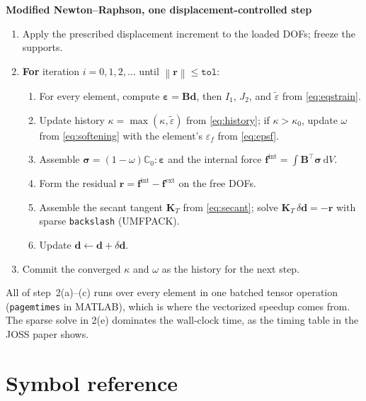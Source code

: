 \documentclass[11pt]{article}
\newcommand{\eps}{\bm{\varepsilon}}
\newcommand{\sig}{\bm{\sigma}}
\newcommand{\C}{\mathbb{C}}
\newcommand{\eqs}{\tilde{\varepsilon}}
\newcommand{\dd}{\,\mathrm{d}}
\newcommand{\norm}[1]{\left\lVert#1\right\rVert}
\begin{document}
\begin{algobox}
\textbf{Modified Newton--Raphson, one displacement-controlled step}
\begin{enumerate}[leftmargin=1.4em,itemsep=2pt]
\item Apply the prescribed displacement increment to the loaded DOFs; freeze the supports.
\item \textbf{For} iteration $i=0,1,2,\dots$ until $\norm{\bm r}\le \texttt{tol}$:
  \begin{enumerate}[leftmargin=1.4em,itemsep=1pt]
  \item For every element, compute $\eps=\bm B\bm d$, then $I_1$, $J_2$, and
        $\eqs$ from \eqref{eq:eqstrain}.
  \item Update history $\kappa=\max(\kappa,\eqs)$ from \eqref{eq:history};
        if $\kappa>\kappa_0$, update $\omega$ from \eqref{eq:softening} with the
        element's $\varepsilon_f$ from \eqref{eq:epsf}.
  \item Assemble $\sig=(1-\omega)\C_0:\eps$ and the internal force
        $\bm f^{\text{int}}=\int\bm B^{\!\top}\sig\dd V$.
  \item Form the residual $\bm r = \bm f^{\text{int}}-\bm f^{\text{ext}}$ on the free DOFs.
  \item Assemble the secant tangent $\bm K_T$ from \eqref{eq:secant};
        solve $\bm K_T\,\delta\bm d = -\bm r$ with sparse \texttt{backslash} (UMFPACK).
  \item Update $\bm d \leftarrow \bm d + \delta\bm d$.
  \end{enumerate}
\item Commit the converged $\kappa$ and $\omega$ as the history for the next step.
\end{enumerate}
\end{algobox}

All of step~2(a)--(c) runs over every element in one batched tensor operation
(\texttt{pagemtimes} in MATLAB), which is where the vectorized speedup comes from. The
sparse solve in 2(e) dominates the wall-clock time, as the timing table in the JOSS paper
shows.

\section{Symbol reference}
\end{document}
